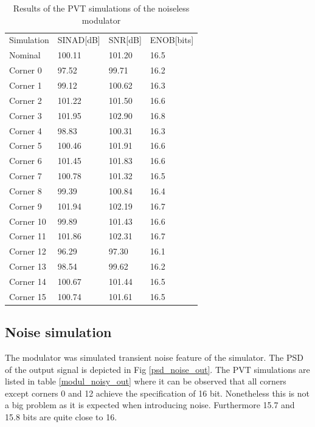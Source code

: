 \begin{table}[H]
\centering

\caption{Results of the PVT simulations of the noiseless modulator}
\label{modul_noiseless_out}
\begin{tabular}{l|l|l|l}
\hline
\multirow{1}{*}{Simulation} & \multicolumn{1}{c|}{SINAD[dB]} & \multicolumn{1}{c|}{SNR[dB]} & \multicolumn{1}{c}{ENOB[bits]} \\\cline{1-4}
                       
            Nominal       &100.11 & 101.20 & 16.5\\
            Corner 0      &97.52 & 99.71 & 16.2\\
            Corner 1      &99.12 & 100.62 & 16.3\\
            Corner 2      &101.22 & 101.50 & 16.6\\
            Corner 3     &101.95 & 102.90 & 16.8\\
            Corner 4     &98.83 & 100.31 & 16.3\\
            Corner 5      &100.46 & 101.91 & 16.6\\
            Corner 6      &101.45& 101.83 & 16.6\\
            Corner 7      &100.78& 101.32 & 16.5\\
            Corner 8      &99.39& 100.84 & 16.4\\
            Corner 9      &101.94& 102.19 & 16.7\\
            Corner 10      &99.89& 101.43 & 16.6\\
            Corner 11      &101.86& 102.31 & 16.7\\
            Corner 12      &96.29& 97.30 & 16.1\\
            Corner 13      &98.54& 99.62 & 16.2\\
            Corner 14      &100.67& 101.44 & 16.5\\
            Corner 15      &100.74& 101.61 & 16.5\\
            
\hline            
\end{tabular}
\end{table}

\subsection{Noise simulation}
The modulator was simulated transient noise feature of the simulator. The PSD of the output signal is depicted in Fig \ref{psd_noise_out}. The PVT simulations are listed in table \ref{modul_noisy_out} where it can be observed that all corners except corners 0 and 12 achieve the specification of 16 bit. Nonetheless this is not a big problem as it is expected when introducing noise. Furthermore 15.7 and 15.8 bits are quite close to 16. 

